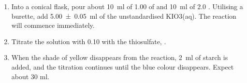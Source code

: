 \begin{enumerate}
	\item Into a conical flask, pour about \SI{10}{ml} of \SI{1.00}{\molar} of  and \SI{10}{ml} of \SI{2.0}{\molar} . Utilising a burette, add \SI{5.00\pm0.05}{ml} of the unstandardised KIO3(aq). The reaction will commence immediately.
	\item Titrate the solution with \SI{0.10}{\molar} with the thiosulfate, .
	\item When the shade of yellow disappears from the reaction, \SI{2}{ml} of starch is added, and the titration continues until the blue colour disappears. Expect about 30 ml.
\end{enumerate}